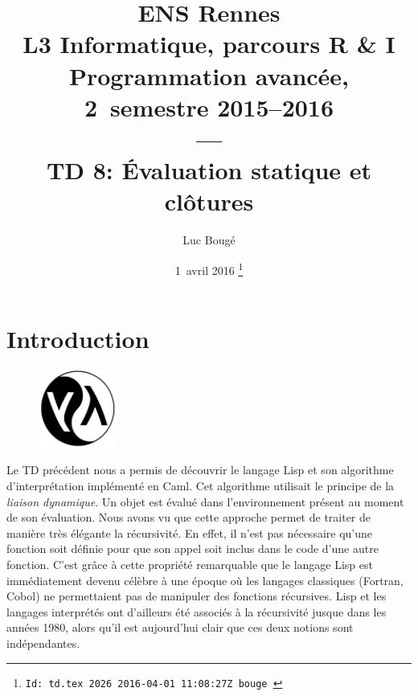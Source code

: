 \documentclass{../../LaTeX/tdsimple}
\begin{document}
\title{ENS Rennes\\
  L3 Informatique, parcours R \& I\\
  Programmation avancée, 2\ieme\ semestre 2015--2016\\
  ---\\
  TD 8: Évaluation statique et clôtures}

\author{%
  Luc Bougé%
}

\date{1\ier\ avril 2016%
  \thanks{%
    \protect\lstinline[language={}]%
    $Id: td.tex 2026 2016-04-01 11:08:27Z bouge $%
  } }


\maketitle

\section*{Introduction}

\begin{figure}
  \includegraphics[width=0.23\textwidth]{lisplogo.png}
\end{figure}

Le TD précédent nous a permis de découvrir le langage Lisp et son
algorithme d'interprétation implémenté en Caml. Cet algorithme
utilisait le principe de la \emph{liaison dynamique}. Un objet est
évalué dans l'environnement présent au moment de son évaluation. Nous
avons vu que cette approche permet de traiter de manière très élégante
la récursivité. En effet, il n'est pas nécessaire qu'une fonction soit
définie pour que son appel soit inclus dans le code d'une autre
fonction. C'est grâce à cette propriété remarquable que le langage
Lisp est immédiatement devenu célèbre à une époque où les langages
classiques (Fortran, Cobol) ne permettaient pas de manipuler des
fonctions récursives. Lisp et les langages interprétés ont d'ailleurs
été associés à la récursivité jusque dans les années 1980, alors qu'il
est aujourd'hui clair que ces deux notions sont indépendantes.
\end{document}
